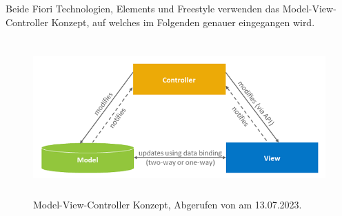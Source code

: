 Beide Fiori Technologien, Elements und Freestyle verwenden das Model-View-Controller Konzept, auf welches im Folgenden genauer eingegangen wird.
\begin{figure}[H]
    \centering
    \includegraphics[height=6cm]{Bilder/Fiori_Model-View-Controller-Konzept.png}
    \caption[Model-View-Controller Konzept]{Model-View-Controller Konzept, Abgerufen von \cite{sap_sapui5-sap-hel-docu_2023} am 13.07.2023.}
    \label{fig:iso_norm}
\end{figure}

